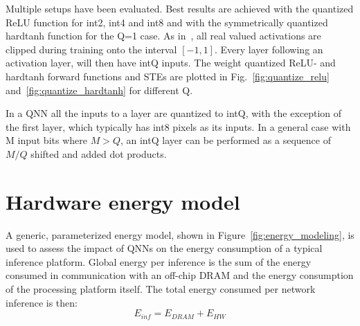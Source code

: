 \documentclass[article,10pt]{IEEEtran}
\begin{document}


Multiple setups have been evaluated. Best results are achieved with the quantized ReLU function for int2, int4 and int8 and with the symmetrically quantized hardtanh function for the Q=1 case. As in~\cite{hubara2016binarized}, all real valued activations are clipped during training onto the interval $[-1,1]$. Every layer following an activation layer, will then have intQ inputs. The weight quantized ReLU- and hardtanh forward functions and STEs are plotted in Fig.~\ref{fig:quantize_relu} and~\ref{fig:quantize_hardtanh} for different Q.

In a QNN all the inputs to a layer are quantized to intQ, with the exception of the first layer, which typically has int8 pixels as its inputs. In a general case with M input bits where $M>Q$, an intQ layer can be performed as a sequence of $M/Q$ shifted and added dot products.

\section{Hardware energy model}
\label{sec:hardware_energy_model}

A generic, parameterized energy model, shown in Figure~\ref{fig:energy_modeling}, is used to assess the impact of QNNs on the energy consumption of a typical inference platform. Global energy per inference is the sum of the energy consumed in communication with an off-chip DRAM and the energy consumption of the processing platform itself. The total energy consumed per network inference is then:
\begin{equation}
\label{eq:total_mem}
 E_{inf} = E_{DRAM} + E_{HW}
\end{equation}
\end{document}

